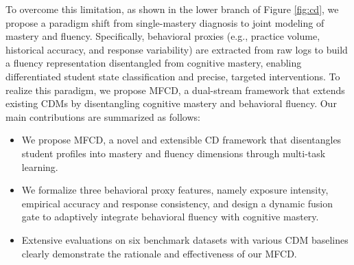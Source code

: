 \documentclass[a4paper,runningheads]{llncs}
\def\mymethod{MFCD}
\begin{document}
To overcome this limitation, as shown in the lower branch of Figure \ref{fig:cd}, we propose a paradigm shift from single-mastery diagnosis to joint modeling of mastery and fluency. Specifically, behavioral proxies (e.g., practice volume, historical accuracy, and response variability) are extracted from raw logs to build a fluency representation disentangled from cognitive mastery, enabling differentiated student state classification and precise, targeted interventions. To realize this paradigm, we propose \mymethod, a dual-stream framework that extends existing CDMs by disentangling cognitive mastery and behavioral fluency. Our main contributions are summarized as follows:
\vspace{-10pt}
\begin{itemize}
    \item We propose \mymethod, a novel and extensible CD framework that disentangles student profiles into mastery and fluency dimensions through  multi-task learning.
    \item We formalize three behavioral proxy features, namely exposure intensity, empirical accuracy and response consistency, and design a dynamic fusion gate to adaptively integrate behavioral fluency with cognitive mastery.
    \item Extensive evaluations on six benchmark datasets with various CDM baselines clearly demonstrate the rationale and effectiveness of our \mymethod.
\end{itemize}


\end{document}
